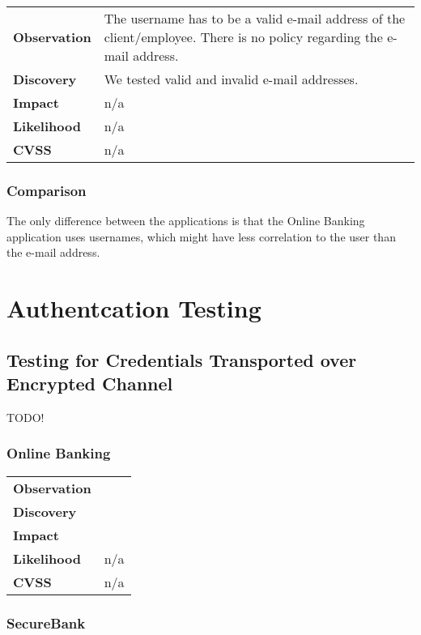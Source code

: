 \begin{tabular}{l|p{10cm}}

\textbf{Observation} & The username has to be a valid e-mail address of the client/employee. There is no policy regarding the e-mail address.  \\
\textbf{Discovery} & We tested valid and invalid e-mail addresses. \\
\textbf{Impact} & n/a \\
\textbf{Likelihood} & n/a \\
\textbf{CVSS} & n/a \\
\end{tabular}

\subsubsection*{Comparison}
The only difference between the applications is that the Online Banking application uses usernames, which might have less correlation to the user than the e-mail address.

\clearpage



\section{Authentcation Testing}

\subsection{Testing for Credentials Transported over Encrypted Channel}

TODO!

\subsubsection*{Online Banking}

\begin{tabular}{l|p{10cm}}

\textbf{Observation} &   \\
\textbf{Discovery} &  \\
\textbf{Impact} &  \\
\textbf{Likelihood} & n/a \\
\textbf{CVSS} & n/a \\
\end{tabular}

\subsubsection*{SecureBank}

